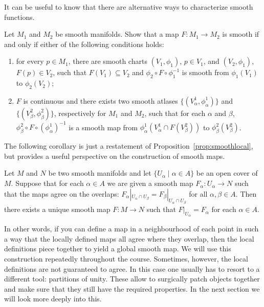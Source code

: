 It can be useful to know that there are alternative ways to characterize smooth functions.
\begin{exercise}\label{prop:eq-def-smooth}
	Let $M_1$ and $M_2$ be smooth manifolds.
	Show that a map $F:M_1\to M_2$ is smooth if and only if either of the following conditions holds:
	\begin{enumerate}
		\item for every $p\in M_1$, there are smooth charts $(V_1,\phi_1)$, $p\in V_1$, and $(V_2,\phi_1)$, $F(p) \in V_2$, such that $F(V_1) \subseteq V_2$ and $\phi_2 \circ F \circ \phi_1^{-1}$ is smooth from $\phi_1(V_1)$ to $\phi_2(V_2)$;
		\item $F$ is continuous and there exists two smooth atlases $\{(V^1_\alpha, \phi^1_\alpha)\}$ and $\{(V^2_\beta, \phi^2_\beta)\}$, respectively for $M_1$ and $M_2$, such that for each $\alpha$ and $\beta$, $\phi^2_\beta \circ F \circ (\phi^1_\alpha)^{-1}$ is a smooth map from $\phi^1_\alpha(V^1_\alpha \cap F(V_\beta^2))$ to $\phi^2_\beta(V^2_\beta)$.
	\end{enumerate}
\end{exercise}

The following corollary is just a restatement of Proposition~\ref{prop:smoothlocal}, but provides a useful perspective on the construction of smooth maps.

\begin{proposition}
	Let $M$ and $N$ be two smooth manifolds and let $\{U_\alpha\mid\alpha\in A\}$ be an open cover of $M$.
	Suppose that for each $\alpha\in A$ we are given a smooth map $F_
		\alpha:U_\alpha\to N$ such that the maps agree on the overlaps: $F_\alpha|_{U_\alpha\cap U_\beta} = F_\beta|_{U_\alpha\cap U_\beta}$ for all $\alpha,\beta\in A$.
	Then there exists a unique smooth map $F:M\to N$ such that $F|_{U_\alpha} = F_\alpha$ for each $\alpha\in A$.
\end{proposition}

In other words, if you can define a map in a neighbourhood of each point in such a way that the locally defined maps all agree where they overlap, then the local definitions piece together to yield a global smooth map.
We will use this construction repeatedly throughout the course.
Sometimes, however, the local definitions are not guaranteed to agree. In this case one usually has to resort to a different tool: partitions of unity.
These allow to surgically patch objects together and make sure that they still have the required properties.
In the next section we will look more deeply into this.

